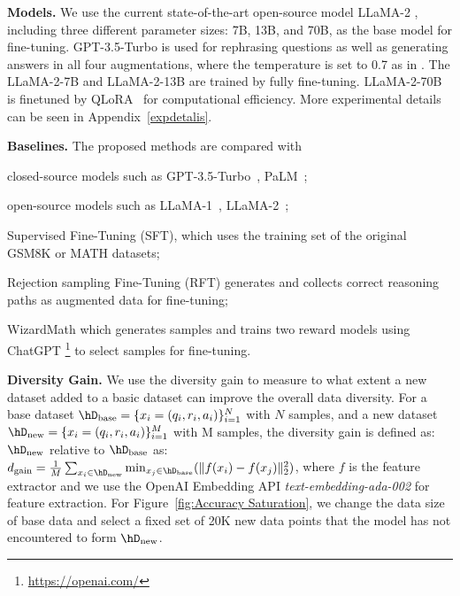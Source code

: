     \textbf{Models.}
    We use the current state-of-the-art open-source model
    LLaMA-2
    \citep{touvron2023llama},
    including three different parameter sizes:
    7B, 
    13B,
    and 
    70B,
    as the base model for fine-tuning.
    GPT-3.5-Turbo is used for rephrasing questions as well as 
    generating answers in all four augmentations,
    where the temperature is set to 0.7 as in \cite{wang2023selfconsistency}.
    The LLaMA-2-7B and LLaMA-2-13B are trained by fully fine-tuning. LLaMA-2-70B is finetuned by QLoRA~\citep{dettmers2023qlora} for computational efficiency. More experimental details can be seen in Appendix~\ref{expdetalis}.
    
    \textbf{Baselines.}
    The proposed methods are compared with 
    \begin{enumerate*}[(i), series = tobecont, itemjoin = \quad]
    \item closed-source models such as GPT-3.5-Turbo~\citep{gpt3-5-turbo}, PaLM~\citep{chowdhery2022palm};
    \item open-source models such as LLaMA-1~\citep{touvron2023llama1}, LLaMA-2~\citep{touvron2023llama};
    \item Supervised Fine-Tuning (SFT),
    which uses the training set of the original GSM8K or MATH datasets;
    \item Rejection sampling Fine-Tuning (RFT) \citep{yuan2023scaling}
    generates and collects correct reasoning paths as 
    augmented data for fine-tuning; 
    \item WizardMath \citep{luo2023wizardmath}
    which generates samples and trains two reward models using ChatGPT \footnote{\url{https://openai.com/}} to select samples for fine-tuning. 
    \end{enumerate*}

    

    \textbf{Diversity Gain.} We use the diversity gain \citep{bilmes2022submodularity} to measure to what extent a new dataset added to a basic dataset can improve the overall data diversity. For a base dataset $\hD_{\text{base}}=\{x_i=(q_i, r_i, a_i)\}_{i=1}^N$ with $N$ samples, and a new dataset $\hD_{\text{new}}=\{x_i=(q_i, r_i, a_i)\}_{i=1}^M$ with M samples, the diversity gain is defined as: $\hD_{\text{new}}$ relative to $\hD_{\text{base}}$ as: $d_{\text{gain}}=\frac{1}{M}\sum_{x_{i}\in\hD_{\text{new}}}\min_{x_{j}\in\hD_{\text{base}}}(\|f(x_{i}) -f(x_{j})\|_2^2)$, where $f$ is the feature extractor and we use the OpenAI Embedding API \textit{text-embedding-ada-002} for feature extraction. For Figure~\ref{fig:Accuracy Saturation}, we change the data size of base data and select a fixed set of 20K new data points that the model has not encountered to form $\hD_{\text{new}}$.

